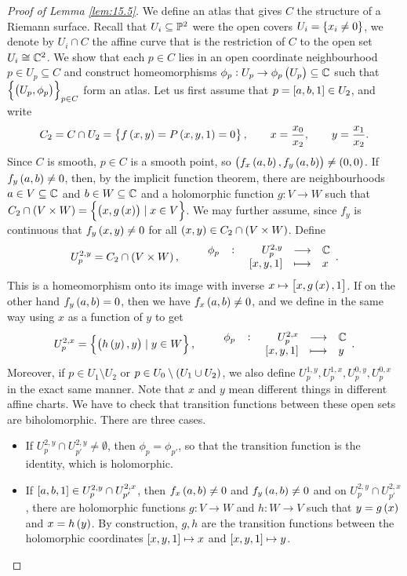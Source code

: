 \pagebreak

\begin{proof}[Proof of Lemma \ref{lem:15.5}]
We define an atlas that gives $ C $ the structure of a Riemann surface. Recall that $ U_i \subseteq \P^2 $ were the open covers $ U_i = \cbr{x_i \ne 0} $, we denote by $ U_i \cap C $ the affine curve that is the restriction of $ C $ to the open set $ U_i \cong \C^2 $. We show that each $ p \in C $ lies in an open coordinate neighbourhood $ p \in U_p \subseteq C $ and construct homeomorphisms $ \phi_p : U_p \to \phi_p\br{U_p} \subseteq \C $ such that $ \cbr{\br{U_p, \phi_p}}_{p \in C} $ form an atlas. Let us first assume that $ p = \sbr{a, b, 1} \in U_2 $, and write
$$ C_2 = C \cap U_2 = \cbr{f\br{x, y} = P\br{x, y, 1} = 0}, \qquad x = \dfrac{x_0}{x_2}, \qquad y = \dfrac{x_1}{x_2}. $$
Since $ C $ is smooth, $ p \in C $ is a smooth point, so $ \br{f_x\br{a, b}, f_y\br{a, b}} \ne \br{0, 0} $. If $ f_y\br{a, b} \ne 0 $, then, by the implicit function theorem, there are neighbourhoods $ a \in V \subseteq \C $ and $ b \in W \subseteq \C $ and a holomorphic function $ g : V \to W $ such that $ C_2 \cap \br{V \times W} = \cbr{\br{x, g\br{x}} \mid x \in V} $. We may further assume, since $ f_y $ is continuous that $ f_y\br{x, y} \ne 0 $ for all $ \br{x, y} \in C_2 \cap \br{V \times W} $. Define
$$ U_p^{2, y} = C_2 \cap \br{V \times W}, \qquad \function[\phi_p]{U_p^{2, y}}{\C}{\sbr{x, y, 1}}{x}. $$
This is a homeomorphism onto its image with inverse $ x \mapsto \sbr{x, g\br{x}, 1} $. If on the other hand $ f_y\br{a, b} = 0 $, then we have $ f_x\br{a, b} \ne 0 $, and we define in the same way using $ x $ as a function of $ y $ to get
$$ U_p^{2, x} = \cbr{\br{h\br{y}, y} \mid y \in W}, \qquad \function[\phi_p]{U_p^{2, x}}{\C}{\sbr{x, y, 1}}{y}. $$
Moreover, if $ p \in U_1 \setminus U_2 $ or $ p \in U_0 \setminus \br{U_1 \cup U_2} $, we also define $ U_p^{1, y}, U_p^{1, x}, U_p^{0, y}, U_p^{0, x} $ in the exact same manner. Note that $ x $ and $ y $ mean different things in different affine charts. We have to check that transition functions between these open sets are biholomorphic. There are three cases.
\begin{itemize}
\item If $ U_p^{2, y} \cap U_{p'}^{2, y} \ne \emptyset $, then $ \phi_p = \phi_{p'} $, so that the transition function is the identity, which is holomorphic.
\item If $ \sbr{a, b, 1} \in U_p^{2, y} \cap U_{p'}^{2, x} $, then $ f_x\br{a, b} \ne 0 $ and $ f_y\br{a, b} \ne 0 $ and on $ U_p^{2, y} \cap U_{p'}^{2, x} $, there are holomorphic functions $ g : V \to W $ and $ h : W \to V $ such that $ y = g\br{x} $ and $ x = h\br{y} $. By construction, $ g, h $ are the transition functions between the holomorphic coordinates $ \sbr{x, y, 1} \mapsto x $ and $ \sbr{x, y, 1} \mapsto y $.

\end{itemize}
\end{proof}
